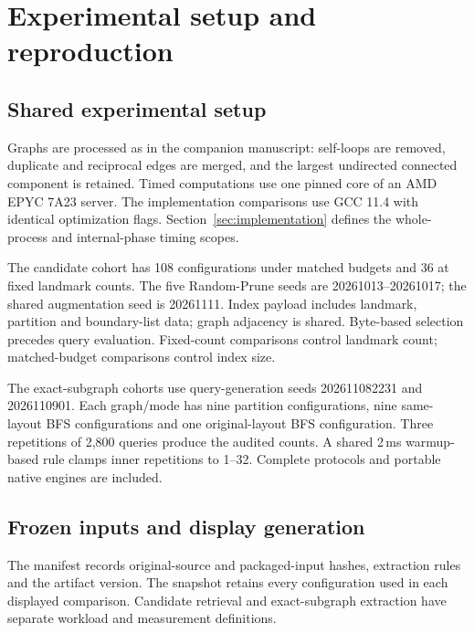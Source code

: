 \section{Experimental setup and reproduction}
\label{sec:reproduction}
\subsection{Shared experimental setup}
Graphs are processed as in the companion manuscript: self-loops are removed, duplicate and reciprocal edges are merged, and the largest undirected connected component is retained. Timed computations use one pinned core of an AMD EPYC 7A23 server. The implementation comparisons use GCC 11.4 with identical optimization flags. Section~\ref{sec:implementation} defines the whole-process and internal-phase timing scopes.

The candidate cohort has 108 configurations under matched budgets and 36 at fixed landmark counts. The five Random-Prune seeds are 20261013--20261017; the shared augmentation seed is 20261111. Index payload includes landmark, partition and boundary-list data; graph adjacency is shared. Byte-based selection precedes query evaluation. Fixed-count comparisons control landmark count; matched-budget comparisons control index size.

The exact-subgraph cohorts use query-generation seeds 202611082231 and 2026110901. Each graph/mode has nine partition configurations, nine same-layout BFS configurations and one original-layout BFS configuration. Three repetitions of 2,800 queries produce the audited counts. A shared 2\,ms warmup-based rule clamps inner repetitions to 1--32. Complete protocols and portable native engines are included.

\subsection{Frozen inputs and display generation}
The manifest records original-source and packaged-input hashes, extraction rules and the artifact version. The snapshot retains every configuration used in each displayed comparison. Candidate retrieval and exact-subgraph extraction have separate workload and measurement definitions.

